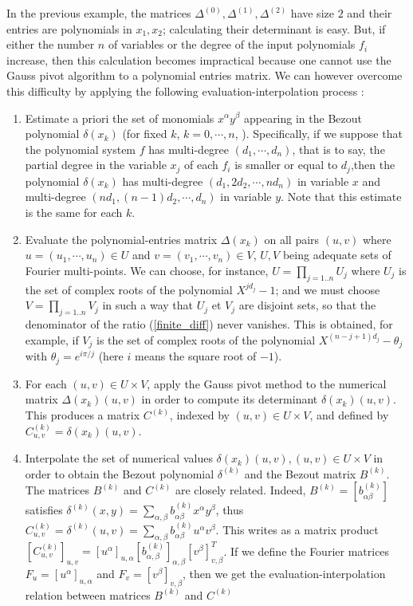 \documentclass{standalone}
\begin{document}
In the previous example, the matrices $\Delta^{(0)}, \Delta^{(1)}, \Delta^{(2)}$ have size $2$ and their entries are polynomials in $x_1, x_2$; calculating their determinant is easy. But, if either the number  $n$ of variables or the degree of the input polynomials $f_i$ increase, then this calculation becomes impractical because one cannot use the Gauss pivot algorithm to a polynomial entries matrix. We can however overcome this difficulty by applying the following evaluation-interpolation process :
\begin{enumerate}
\item
Estimate a priori the set of monomials $x^\alpha y^\beta$ appearing in the Bezout polynomial $\delta(x_k)$ (for fixed $k$, $k = 0,\cdots, n$, ). Specifically, if we suppose that the polynomial system $f$ has multi-degree $(d_1, \cdots, d_n)$, that is to say, the partial degree in the variable $x_j$ of each $f_i$ is smaller or equal to $d_j$,then the polynomial $\delta(x_k)$ has multi-degree $(d_1, 2d_2, \cdots, nd_n)$ in variable $x$ and multi-degree $(nd_1, (n-1)d_2, \cdots, d_n)$ in variable $y$. Note that this estimate is the same for each $k$.
\item
Evaluate the polynomial-entries matrix $\Delta(x_k)$ on all pairs $(u, v)$ where $u = (u_1,\cdots, u_n) \in U$ and $v = (v_1,\cdots, v_n) \in V$, $U, V$ being adequate sets of Fourier multi-points. We can choose, for instance, $U = \prod_{j=1..n} U_j$ where $U_j$ is the set of complex roots of the polynomial $X^{jd_j} - 1$; and we must choose $V = \prod_{j=1..n} V_j$ in such a way that $U_j$ et $V_j$ are disjoint sets, so that the denominator of the ratio (\ref{finite_diff}) never vanishes. This is obtained, for example, if $V_j$ is the set of complex roots of the polynomial $X^{(n-j+1)d_j} - \theta_j$ with $\theta_j = e^{i\pi/j}$ (here $i$ means the square root of $-1$). 
\item
For each $(u, v) \in U\times V$, apply the Gauss pivot method to the numerical matrix $\Delta(x_k)(u, v)$ in order to compute its determinant $\delta(x_k)(u, v)$. This produces a matrix $C^{(k)}$, indexed by $(u, v) \in U\times V$, and defined by $C^{(k)}_{u, v} = \delta(x_k)(u, v)$.
\item
Interpolate the set of numerical values $\delta(x_k)(u, v), (u, v) \in U\times V$ in order to obtain the Bezout polynomial $\delta^{(k)}$ and the Bezout matrix $B^{(k)}$. The matrices $B^{(k)}$ and $C^{(k)}$ are closely related. Indeed, $B^{(k)} = \left[b^{(k)}_{\alpha\beta}\right]$ satisfies $\delta^{(k)}(x, y) = \sum_{\alpha,\beta} b^{(k)}_{\alpha\beta} x^\alpha y^\beta$, thus $C^{(k)}_{u,v} = \delta^{(k)}(u, v) = \sum_{\alpha,\beta} b^{(k)}_{\alpha\beta} u^\alpha v^\beta$. This writes as a matrix product $\left[C^{(k)}_{u,v}\right]_{u,v} = \left[u^\alpha\right]_{u,\alpha} \left[b^{(k)}_{\alpha,\beta}\right]_{\alpha, \beta} \left[v^\beta\right]_{v, \beta}^T$. If we define the Fourier matrices $F_u = \left[ u^\alpha \right]_{u, \alpha}$ and $F_v = \left[ v^\beta \right]_{v, \beta}$, then we get the evaluation-interpolation relation between matrices $B^{(k)}$ and $C^{(k)}$

\end{enumerate}
\end{document}
